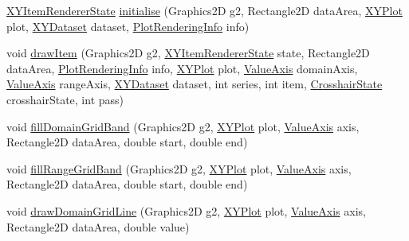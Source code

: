 \begin{DoxyCompactItemize}
\item 
\mbox{\hyperlink{classorg_1_1jfree_1_1chart_1_1renderer_1_1xy_1_1_x_y_item_renderer_state}{X\+Y\+Item\+Renderer\+State}} \mbox{\hyperlink{interfaceorg_1_1jfree_1_1chart_1_1renderer_1_1xy_1_1_x_y_item_renderer_ad3313de1104e462f8299b58ce9901cfb}{initialise}} (Graphics2D g2, Rectangle2D data\+Area, \mbox{\hyperlink{classorg_1_1jfree_1_1chart_1_1plot_1_1_x_y_plot}{X\+Y\+Plot}} plot, \mbox{\hyperlink{interfaceorg_1_1jfree_1_1data_1_1xy_1_1_x_y_dataset}{X\+Y\+Dataset}} dataset, \mbox{\hyperlink{classorg_1_1jfree_1_1chart_1_1plot_1_1_plot_rendering_info}{Plot\+Rendering\+Info}} info)
\item 
void \mbox{\hyperlink{interfaceorg_1_1jfree_1_1chart_1_1renderer_1_1xy_1_1_x_y_item_renderer_ad867040a3ea09f5127596aacdd94586a}{draw\+Item}} (Graphics2D g2, \mbox{\hyperlink{classorg_1_1jfree_1_1chart_1_1renderer_1_1xy_1_1_x_y_item_renderer_state}{X\+Y\+Item\+Renderer\+State}} state, Rectangle2D data\+Area, \mbox{\hyperlink{classorg_1_1jfree_1_1chart_1_1plot_1_1_plot_rendering_info}{Plot\+Rendering\+Info}} info, \mbox{\hyperlink{classorg_1_1jfree_1_1chart_1_1plot_1_1_x_y_plot}{X\+Y\+Plot}} plot, \mbox{\hyperlink{classorg_1_1jfree_1_1chart_1_1axis_1_1_value_axis}{Value\+Axis}} domain\+Axis, \mbox{\hyperlink{classorg_1_1jfree_1_1chart_1_1axis_1_1_value_axis}{Value\+Axis}} range\+Axis, \mbox{\hyperlink{interfaceorg_1_1jfree_1_1data_1_1xy_1_1_x_y_dataset}{X\+Y\+Dataset}} dataset, int series, int item, \mbox{\hyperlink{classorg_1_1jfree_1_1chart_1_1plot_1_1_crosshair_state}{Crosshair\+State}} crosshair\+State, int pass)
\item 
void \mbox{\hyperlink{interfaceorg_1_1jfree_1_1chart_1_1renderer_1_1xy_1_1_x_y_item_renderer_abfbaf177fd506a082efa8745a2e0ca88}{fill\+Domain\+Grid\+Band}} (Graphics2D g2, \mbox{\hyperlink{classorg_1_1jfree_1_1chart_1_1plot_1_1_x_y_plot}{X\+Y\+Plot}} plot, \mbox{\hyperlink{classorg_1_1jfree_1_1chart_1_1axis_1_1_value_axis}{Value\+Axis}} axis, Rectangle2D data\+Area, double start, double end)
\item 
void \mbox{\hyperlink{interfaceorg_1_1jfree_1_1chart_1_1renderer_1_1xy_1_1_x_y_item_renderer_aeaf733eb076fadb2f31b09aac246f3a5}{fill\+Range\+Grid\+Band}} (Graphics2D g2, \mbox{\hyperlink{classorg_1_1jfree_1_1chart_1_1plot_1_1_x_y_plot}{X\+Y\+Plot}} plot, \mbox{\hyperlink{classorg_1_1jfree_1_1chart_1_1axis_1_1_value_axis}{Value\+Axis}} axis, Rectangle2D data\+Area, double start, double end)
\item 
void \mbox{\hyperlink{interfaceorg_1_1jfree_1_1chart_1_1renderer_1_1xy_1_1_x_y_item_renderer_af51101ed44b89f90872908929ff511e5}{draw\+Domain\+Grid\+Line}} (Graphics2D g2, \mbox{\hyperlink{classorg_1_1jfree_1_1chart_1_1plot_1_1_x_y_plot}{X\+Y\+Plot}} plot, \mbox{\hyperlink{classorg_1_1jfree_1_1chart_1_1axis_1_1_value_axis}{Value\+Axis}} axis, Rectangle2D data\+Area, double value)

\end{DoxyCompactItemize}
